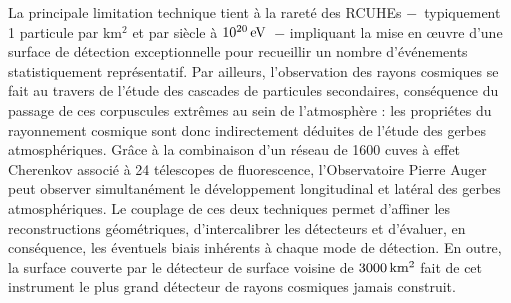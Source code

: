 \documentclass[10pt,a4paper,twoside]{report}
\begin{document}
La principale limitation technique tient à la rareté des RCUHEs
$-$~typiquement 1 particule par km$^2$ et par siècle à
$\unit[10^{20}]{eV}$~$-$ impliquant la mise en \oe uvre d'une surface
de détection exceptionnelle pour recueillir un nombre d'événements
statistiquement représentatif. Par ailleurs, l'observation des rayons
cosmiques se fait au travers de l'étude des cascades de particules
secondaires, conséquence du passage de ces corpuscules extrêmes au
sein de l'atmosphère : les propriétes du rayonnement cosmique sont
donc indirectement déduites de l'étude des gerbes
atmosphériques. Grâce à la combinaison d'un réseau de 1600 cuves à
effet Cherenkov associé à 24 télescopes de fluorescence,
l'Observatoire Pierre Auger peut observer simultanément le
dévelop\-pement longitudinal et latéral des gerbes atmosphériques. Le
couplage de ces deux techniques permet d'affiner les reconstructions
géométriques, d'intercalibrer les détecteurs et d'évaluer, en
conséquence, les éventuels biais inhérents à chaque mode de
détection. En outre, la surface couverte par le détecteur de surface
voisine de $\unit[3000]{km^2}$ fait de cet instrument le plus grand
détecteur de rayons cosmiques jamais construit.
\end{document}
